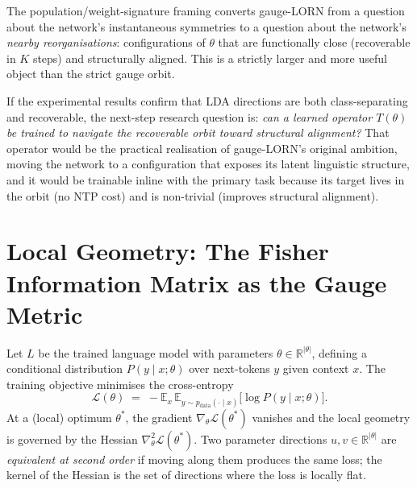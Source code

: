 \documentclass[11pt, a4paper]{article}
\theoremstyle{plain}
\theoremstyle{definition}
\theoremstyle{remark}
\begin{document}
The population/weight-signature framing converts gauge-LORN from a question about the network's instantaneous symmetries to a question about the network's \emph{nearby reorganisations}: configurations of $\theta$ that are functionally close (recoverable in $K$ steps) and structurally aligned.
This is a strictly larger and more useful object than the strict gauge orbit.

If the experimental results confirm that LDA directions are both class-separating and recoverable, the next-step research question is: \emph{can a learned operator $T(\theta)$ be trained to navigate the recoverable orbit toward structural alignment?}
That operator would be the practical realisation of gauge-LORN's original ambition, moving the network to a configuration that exposes its latent linguistic structure, and it would be trainable inline with the primary task because its target lives in the orbit (no NTP cost) and is non-trivial (improves structural alignment).


\section{Local Geometry: The Fisher Information Matrix as the Gauge Metric}
\label{sec:local-geometry}

Let $L$ be the trained language model with parameters $\theta \in \mathbb{R}^{|\theta|}$, defining a conditional distribution $P(y \mid x; \theta)$ over next-tokens $y$ given context $x$.
The training objective minimises the cross-entropy
\[
\mathcal{L}(\theta) \;=\; -\mathbb{E}_{x}\,\mathbb{E}_{y \sim p_{\text{data}}(\cdot \mid x)}\big[ \log P(y \mid x; \theta) \big].
\]
At a (local) optimum $\theta^{*}$, the gradient $\nabla_\theta \mathcal{L}(\theta^{*})$ vanishes and the local geometry is governed by the Hessian $\nabla^{2}_\theta \mathcal{L}(\theta^{*})$.
Two parameter directions $u, v \in \mathbb{R}^{|\theta|}$ are \emph{equivalent at second order} if moving along them produces the same loss; the kernel of the Hessian is the set of directions where the loss is locally flat.
\end{document}
